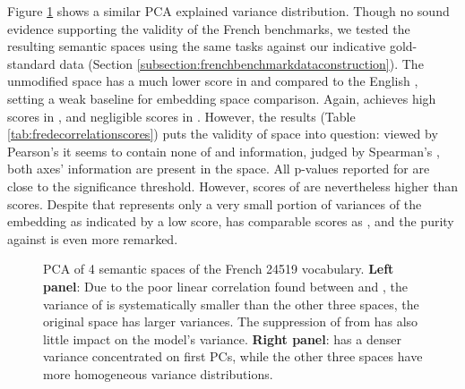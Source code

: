 Figure \ref{fig:FreDecorVarRatio} shows a similar PCA explained variance distribution. Though no sound evidence supporting the validity of the French benchmarks, we tested the resulting semantic spaces using the same tasks against our indicative gold-standard data (Section \ref{subsection:frenchbenchmarkdataconstruction}). The unmodified  space has a much lower score in \similarity and \association compared to the English , setting a weak baseline for embedding space comparison. Again,  achieves high scores in \similarity, and negligible scores in \association. However, the results (Table \ref{tab:fredecorrelationscores}) puts the validity of  space into question: viewed by Pearson's  it seems to contain none of \similarity and \association information, judged by Spearman's , both axes' information are present in the space. All p-values reported for  are close to the significance threshold. However, \association scores of  are nevertheless higher than \similarity scores. Despite that  represents only a very small portion of variances of the  embedding as indicated by a low  score,  has comparable \similarity scores as , and the purity against \association is even more remarked. 

\begin{figure}
    \centering
    \caption[EVR of 4 Semantic Spaces, French]{PCA of 4 semantic spaces of the French 24519 vocabulary. \textbf{Left panel}: Due to the poor linear correlation found between  and , the variance of  is systematically smaller than the other three spaces, the original space  has larger variances. The suppression of  from  has also little impact on the model's variance. \textbf{Right panel}:  has a denser variance concentrated on first PCs, while the other three spaces have more homogeneous variance distributions.\label{fig:FreDecorVarRatio}} 
    
\end{figure}

